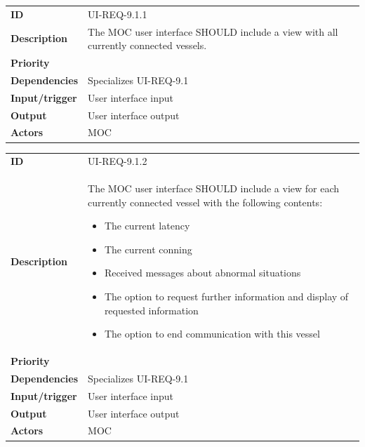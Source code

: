 \begin{table}[H]
	\centering
	\begin{tabularx}{\textwidth}{ l X }
		\rowcolor[HTML]{E7E7E7}
		\textbf{ID} & UI-REQ-9.1.1 \\
		\textbf{Description} & The MOC user interface SHOULD include a view with all currently connected vessels. \\
		\rowcolor[HTML]{E7E7E7}
		\textbf{Priority} & \priolow \\
		\textbf{Dependencies} & Specializes UI-REQ-9.1 \\
		\rowcolor[HTML]{E7E7E7}
		\textbf{Input/trigger} & User interface input \\
		\textbf{Output} & User interface output \\
		\rowcolor[HTML]{E7E7E7}
		\textbf{Actors} & MOC \\
	\end{tabularx}
	\label{table:ui-req-9.1.1}
\end{table}

\begin{table}[H]
	\centering
	\begin{tabularx}{\textwidth}{ l X }
		\rowcolor[HTML]{E7E7E7}
		\textbf{ID} & UI-REQ-9.1.2 \\
		\textbf{Description} & The MOC user interface SHOULD include a view for each currently connected vessel with the following contents:
			\begin{itemize}
				\item The current latency
				\item The current conning
				\item Received messages about abnormal situations
				\item The option to request further information and display of requested information
				\item The option to end communication with this vessel
			\end{itemize} \\
		\rowcolor[HTML]{E7E7E7}
		\textbf{Priority} & \priolow \\
		\textbf{Dependencies} & Specializes UI-REQ-9.1 \\
		\rowcolor[HTML]{E7E7E7}
		\textbf{Input/trigger} & User interface input \\
		\textbf{Output} & User interface output \\
		\rowcolor[HTML]{E7E7E7}
		\textbf{Actors} & MOC \\
	\end{tabularx}
	\label{table:ui-req-9.1.2}
\end{table}

